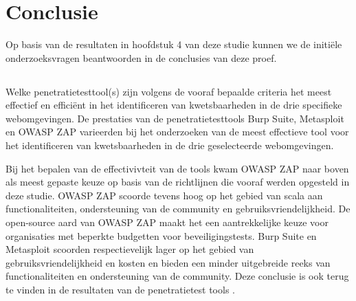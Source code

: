 
\chapter{Conclusie}%
\label{ch:conclusie}


Op basis van de resultaten in hoofdstuk 4 van deze studie kunnen we de initiële onderzoeksvragen beantwoorden in de 
conclusies van deze proef.

\section{}
  Welke penetratietesttool(s) zijn volgens de vooraf bepaalde criteria het meest effectief en efficiënt in het 
  identificeren van kwetsbaarheden in de drie specifieke webomgevingen.  
  De prestaties van de penetratietesttools Burp Suite, Metasploit en OWASP ZAP varieerden bij het onderzoeken van de 
  meest effectieve tool voor het identificeren van kwetsbaarheden in de drie geselecteerde webomgevingen.

  Bij het bepalen van de effectivivteit van de tools kwam OWASP ZAP naar boven als meest gepaste keuze op basis van de richtlijnen 
  die vooraf werden opgesteld in deze studie. OWASP ZAP scoorde tevens hoog op het gebied van scala aan functionaliteiten, 
  ondersteuning van de community en gebruiksvriendelijkheid. De open-source aard van OWASP ZAP maakt het een aantrekkelijke 
  keuze voor organisaties met beperkte budgetten voor beveiligingstests. Burp Suite en Metasploit scoorden respectievelijk 
  lager op het gebied van gebruiksvriendelijkheid en kosten en bieden een minder uitgebreide reeks van functionaliteiten en 
  ondersteuning van de community. Deze conclusie is ook terug te vinden in de resultaten van de penetratietest tools 
  .

